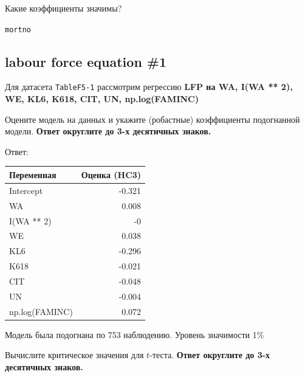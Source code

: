 \documentclass[
  russian,
]{article}
\newcounter{none} %
\begin{document}
Какие коэффициенты значимы?

\begin{tcolorbox}[enhanced jigsaw, arc=.35mm, bottomrule=.15mm, bottomtitle=1mm, breakable, colback=white, colbacktitle=quarto-callout-note-color!10!white, colframe=quarto-callout-note-color-frame, coltitle=black, left=2mm, leftrule=.75mm, opacityback=0, opacitybacktitle=0.6, rightrule=.15mm, title=\textcolor{quarto-callout-note-color}{\faInfo}\hspace{0.5em}{Коэффициенты, значимые на уровне 1\% (по робастным стандартным ошибкам
HC3)}, titlerule=0mm, toprule=.15mm, toptitle=1mm]

\texttt{mortno}

\end{tcolorbox}

\subsection{labour force equation \#1}\label{labour-force-equation-1-1}

Для датасета \texttt{TableF5-1} рассмотрим регрессию \textbf{LFP на WA,
I(WA ** 2), WE, KL6, K618, CIT, UN, np.log(FAMINC)}

Оцените модель на данных и укажите (робастные) коэффициенты подогнанной
модели. \textbf{Ответ округлите до 3-х десятичных знаков.}

Ответ:

{\def\LTcaptype{none} %
\begin{longtable}[]{@{}lr@{}}
\toprule\noalign{}
Переменная & Оценка (HC3) \\
\midrule\noalign{}
\endhead
\bottomrule\noalign{}
\endlastfoot
Intercept & -0.321 \\
WA & 0.008 \\
I(WA ** 2) & -0 \\
WE & 0.038 \\
KL6 & -0.296 \\
K618 & -0.021 \\
CIT & -0.048 \\
UN & -0.004 \\
np.log(FAMINC) & 0.072 \\
\end{longtable}
}

Модель была подогнана по 753 наблюдению. {Уровень значимости 1\%}

Вычислите критическое значения для \(t\)-теста. \textbf{Ответ округлите
до 3-х десятичных знаков.}
\end{document}
